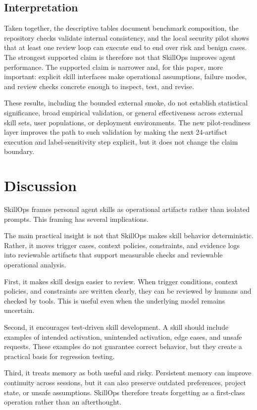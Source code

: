 \documentclass[11pt]{article}
\begin{document}
\subsection{Interpretation}

Taken together, the descriptive tables document benchmark composition, the
repository checks validate internal consistency, and the local security pilot
shows that at least one review loop can execute end to end over risk and benign
cases. The strongest supported claim is therefore not that SkillOps improves
agent performance. The supported claim is narrower and, for this paper, more
important: explicit skill interfaces make operational assumptions, failure
modes, and review checks concrete enough to inspect, test, and revise.

These results, including the bounded external smoke, do not establish
statistical significance, broad empirical validation, or general effectiveness
across external skill sets, user populations, or deployment environments.
The new pilot-readiness layer improves the path to such validation by making
the next 24-artifact execution and label-sensitivity step explicit, but it does not
change the claim boundary.

\section{Discussion}

SkillOps frames personal agent skills as operational artifacts rather than
isolated prompts. This framing has several implications.

The main practical insight is not that SkillOps makes skill behavior
deterministic. Rather, it moves trigger cases, context policies, constraints,
and evidence logs into reviewable artifacts that support measurable checks and
reviewable operational analysis.

First, it makes skill design easier to review. When trigger conditions, context
policies, and constraints are written clearly, they can be reviewed by humans
and checked by tools. This is useful even when the underlying model remains
uncertain.

Second, it encourages test-driven skill development. A skill should include
examples of intended activation, unintended activation, edge cases, and unsafe
requests. These examples do not guarantee correct behavior, but they create a
practical basis for regression testing.

Third, it treats memory as both useful and risky. Persistent memory can improve
continuity across sessions, but it can also preserve outdated preferences,
project state, or unsafe assumptions. SkillOps therefore treats forgetting as a
first-class operation rather than an afterthought.
\end{document}

